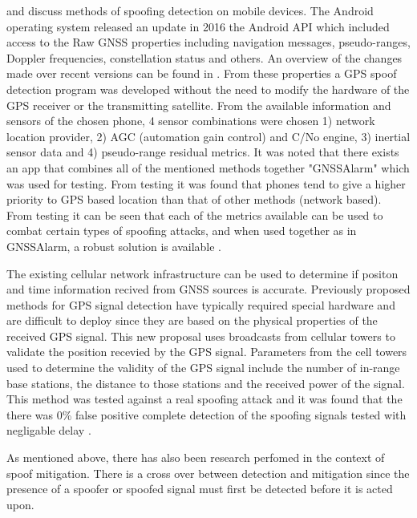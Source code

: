 \textcite{RN31} and \textcite{RN42} discuss methods of spoofing detection on mobile devices.
The Android operating system released an update in 2016 the Android API which included access to the Raw GNSS properties including navigation messages, pseudo-ranges,
Doppler frequencies, constellation status and others. An overview of the changes made over recent versions can be found in \cite{RN39}. From these properties a GPS spoof detection program
was developed without the need to modify the hardware of the GPS receiver or the transmitting satellite. From the available information and sensors of the chosen phone, 4 sensor combinations were chosen 1) network location provider, 2) AGC (automation gain control) and C/No engine,
3) inertial sensor data and 4) pseudo-range residual metrics. It was noted that there exists an app that combines all of the mentioned methods together "GNSSAlarm" which was
used for testing. From testing it was found that phones tend to give a higher priority to GPS based location than that of other methods (network based). 
From testing it can be seen that each of the metrics available can be used to combat certain types of spoofing attacks, and when used together as in GNSSAlarm, 
a robust solution is available \cite{RN31}.

The existing cellular network infrastructure can be used to determine if positon and time information recived from GNSS sources is accurate. Previously
proposed methods for GPS signal detection have typically required special hardware and are difficult to deploy since they are based on the physical properties of the
received GPS signal. This new proposal uses broadcasts from cellular towers to validate the position recevied by the GPS signal. Parameters from the cell towers used to
determine the validity of the GPS signal include the number of in-range base stations, the distance to those stations and the received power of the signal. This method
was tested against a real spoofing attack and it was found that the there was 0\% false positive complete detection of the spoofing signals tested with negligable delay
\cite{RN42}.

As mentioned above, there has also been research perfomed in the context of spoof mitigation. There is a cross over between detection and mitigation since the presence of
a spoofer or spoofed signal must first be detected before it is acted upon.

